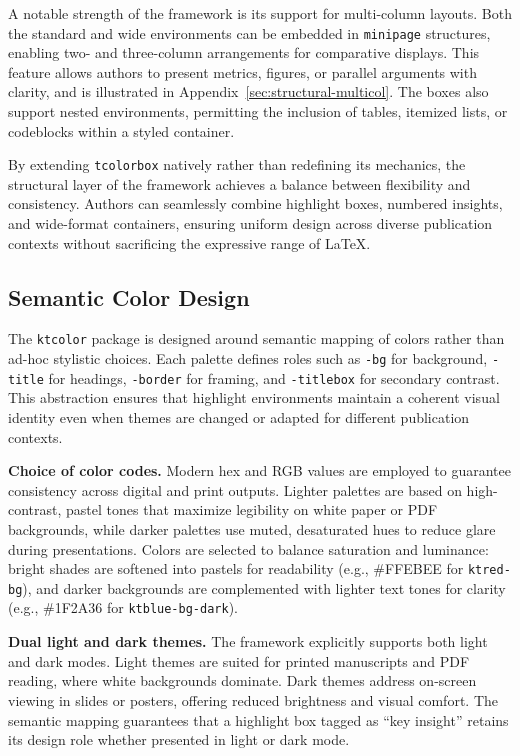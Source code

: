 \documentclass[12pt,onecolumn]{article}
\begin{document}
  A notable strength of the framework is its support for multi-column layouts. Both the standard and wide environments can be embedded in \texttt{minipage} structures, enabling two- and three-column arrangements for comparative displays. This feature allows authors to present metrics, figures, or parallel arguments with clarity, and is illustrated in Appendix~\ref{sec:structural-multicol}. The boxes also support nested environments, permitting the inclusion of tables, itemized lists, or codeblocks within a styled container.

  By extending \texttt{tcolorbox} natively rather than redefining its mechanics, the structural layer of the framework achieves a balance between flexibility and consistency. Authors can seamlessly combine highlight boxes, numbered insights, and wide-format containers, ensuring uniform design across diverse publication contexts without sacrificing the expressive range of LaTeX.

\subsection{Semantic Color Design}
\label{sec:semantic-color-design}
  The \texttt{ktcolor} package is designed around semantic mapping of colors rather than ad-hoc stylistic choices. Each palette defines roles such as \texttt{-bg} for background, \texttt{-title} for headings, \texttt{-border} for framing, and \texttt{-titlebox} for secondary contrast. This abstraction ensures that highlight environments maintain a coherent visual identity even when themes are changed or adapted for different publication contexts.

  \textbf{Choice of color codes.} Modern hex and RGB values are employed to guarantee consistency across digital and print outputs. Lighter palettes are based on high-contrast, pastel tones that maximize legibility on white paper or PDF backgrounds, while darker palettes use muted, desaturated hues to reduce glare during presentations. Colors are selected to balance saturation and luminance: bright shades are softened into pastels for readability (e.g., \#FFEBEE for \texttt{ktred-bg}), and darker backgrounds are complemented with lighter text tones for clarity (e.g., \#1F2A36 for \texttt{ktblue-bg-dark}).

  \textbf{Dual light and dark themes.} The framework explicitly supports both light and dark modes. Light themes are suited for printed manuscripts and PDF reading, where white backgrounds dominate. Dark themes address on-screen viewing in slides or posters, offering reduced brightness and visual comfort. The semantic mapping guarantees that a highlight box tagged as “key insight” retains its design role whether presented in light or dark mode.
\end{document}
